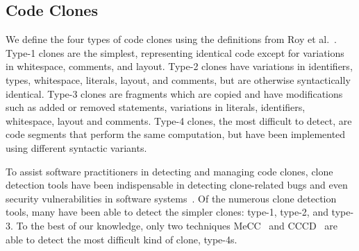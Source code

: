 

\subsection{Code Clones}



We define the four types of code clones using the definitions from Roy et al.~\cite{Roy:2009:CEC:1530898.1531101}. Type-1 clones are the simplest, representing identical code except for variations in whitespace, comments, and layout. Type-2 clones have variations in identifiers, types, whitespace, literals, layout, and comments, but are otherwise syntactically identical. Type-3 clones are fragments which are copied and have modifications such as added or removed statements, variations in literals, identifiers, whitespace, layout and comments. Type-4 clones, the most difficult to detect, are code segments that perform the same computation, but have been implemented using different syntactic variants.

To assist software practitioners in detecting and managing code clones, clone detection tools have been indispensable in detecting clone-related bugs and even security vulnerabilities in software systems~\cite{Dang:2012:XTC:2420950.2421004}. Of the numerous clone detection tools, many have been able to detect the simpler clones: type-1, type-2, and type-3. To the best of our knowledge, only two techniques MeCC~\cite{Kim:2011:MMC:1985793.1985835} and CCCD~\cite{wcre2013} are able to detect the most difficult kind of clone, type-4s.


